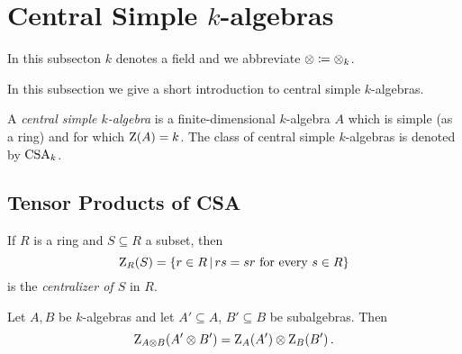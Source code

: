 \section{Central Simple \texorpdfstring{$k$}{k}-algebras}


\begin{conventions}
  In this subsecton $k$ denotes a field and we abbreviate $\otimes \coloneqq \otimes_k$.
\end{conventions}


\begin{fluff}
  In this subsection we give a short introduction to central simple $k$-algebras.
\end{fluff}


\begin{definition}
  A \emph{central simple $k$-algebra} is a finite-dimensional $k$-algebra $A$ which is simple (as a ring) and for which $\operatorname{Z}(A) = k$.
  The class of central simple $k$-algebras is denoted by $\operatorname{CSA}_k$.
\end{definition}





\subsection{Tensor Products of CSA}


\begin{definition}
  If $R$ is a ring and $S \subseteq R$ a subset, then
  \[
      \centralizer_R(S)
    = \{
        r \in R
      \suchthat
        \text{$rs = sr$ for every $s \in R$}
      \}
  \]
  is the \emph{centralizer of $S$} in $R$.
\end{definition}


\begin{lemma}
  \label{lemma: centralizer componentwise}
  Let $A, B$ be $k$-algebras and let $A' \subseteq A$, $B' \subseteq B$ be subalgebras.
  Then
  \[
      \operatorname{Z}_{A \otimes B}(A' \otimes B')
    = \operatorname{Z}_A(A') \otimes \operatorname{Z}_B(B') \,.
  \]
\end{lemma}


